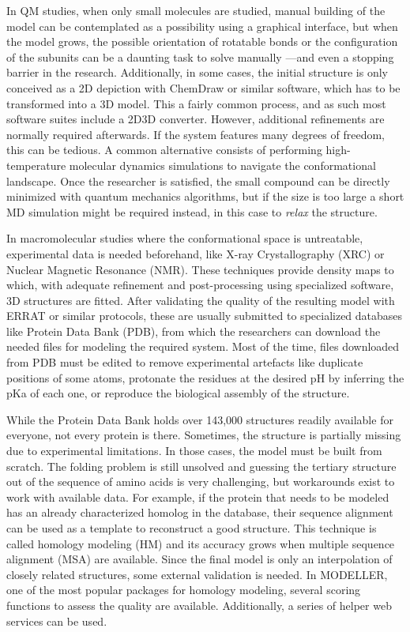 In QM studies, when only small molecules are studied, manual building of the model can be contemplated as a possibility using a graphical interface,\cite{gaussview,avogadro} but when the model grows, the possible orientation of rotatable bonds or the configuration of the subunits can be a daunting task to solve manually ---and even a stopping barrier in the research. Additionally, in some cases, the initial structure is only conceived as a 2D depiction with ChemDraw\cite{chemdraw} or similar software, which has to be transformed into a 3D model. This a fairly common process, and as such most software suites include a 2D\textrightarrow 3D converter. However, additional refinements are normally required afterwards. If the system features many degrees of freedom, this can be tedious. A common alternative consists of performing high-temperature molecular dynamics simulations to navigate the conformational landscape. Once the researcher is satisfied, the small compound can be directly minimized with quantum mechanics algorithms, but if the size is too large a short MD simulation might be required instead, in this case to \textit{relax} the structure.

In macromolecular studies where the conformational space is untreatable, experimental data is needed beforehand, like X-ray Crystallography (XRC) or Nuclear Magnetic Resonance (NMR). These techniques provide density maps to which, with adequate refinement and post-processing using specialized software,\cite{ccp4,phenix} 3D structures are fitted. After validating the quality of the resulting model with ERRAT\cite{errat} or similar protocols, these are usually submitted to specialized databases like Protein Data Bank (PDB),\cite{proteindatabank} from which the researchers can download the needed files for modeling the required system. Most of the time, files downloaded from PDB must be edited to remove experimental artefacts like duplicate positions of some atoms, protonate the residues at the desired pH by inferring the pKa of each one,\cite{word1999asparagine,propka,addh} or reproduce the biological assembly of the structure.\cite{bietz2016siena,sym}

While the Protein Data Bank holds over 143,000 structures readily available for everyone, not every protein is there. Sometimes, the structure is partially missing due to experimental limitations. In those cases, the model must be built from scratch. The folding problem\cite{Dill1042} is still unsolved and guessing the tertiary structure out of the sequence of amino acids is very challenging, but workarounds exist to work with available data. For example, if the protein that needs to be modeled has an already characterized homolog in the database, their sequence alignment can be used as a template to reconstruct a good structure. This technique is called homology modeling (HM) and its accuracy grows when multiple sequence alignment (MSA) are available. Since the final model is only an interpolation of closely related structures, some external validation is needed. In MODELLER, one of the most popular packages for homology modeling, several scoring functions to assess the quality are available. Additionally, a series of helper web services can be used.\cite{errat,benkert2008qmean,wang2011apollo}

